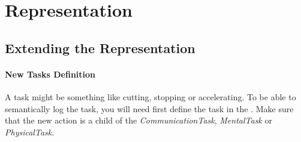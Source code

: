 \chapter{Representation}
\label{chap:represenation}


\section{Extending the Representation}
\label{sec:extension}
\subsubsection{New Tasks Definition}
\label{sec:extension,subsec:task}
A task might be something like cutting, stopping or accelerating.
To be able to semantically log the task, you will need first define the task in the \easeAct.
Make sure that the new action is a child of the \textit{CommunicationTask}, \textit{MentalTask} or \textit{PhysicalTask}.
